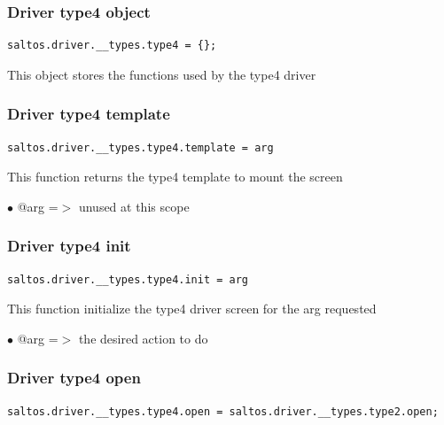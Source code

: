 \documentclass[a4paper]{article}
\begin{document}
\hypertarget{toc197}{}
\subsubsection{Driver type4 object}

\begin{lstlisting}
saltos.driver.__types.type4 = {};
\end{lstlisting}

This object stores the functions used by the type4 driver

\hypertarget{toc198}{}
\subsubsection{Driver type4 template}

\begin{lstlisting}
saltos.driver.__types.type4.template = arg
\end{lstlisting}

This function returns the type4 template to mount the screen

\begin{compactitem}
\item[\color{myblue}$\bullet$] @arg =$>$ unused at this scope
\end{compactitem}

\hypertarget{toc199}{}
\subsubsection{Driver type4 init}

\begin{lstlisting}
saltos.driver.__types.type4.init = arg
\end{lstlisting}

This function initialize the type4 driver screen for the arg requested

\begin{compactitem}
\item[\color{myblue}$\bullet$] @arg =$>$ the desired action to do
\end{compactitem}

\hypertarget{toc200}{}
\subsubsection{Driver type4 open}

\begin{lstlisting}
saltos.driver.__types.type4.open = saltos.driver.__types.type2.open;
\end{lstlisting}
\end{document}
